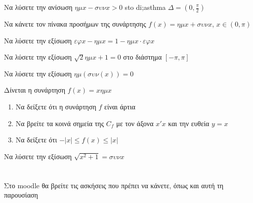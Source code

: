 \documentclass{../presentation}
\begin{document}
\begin{askisi}
  Να λύσετε την ανίσωση $ημx-συνx>0$ sto di;asthma $Δ=(0,\frac{π}{2})$

\end{askisi}

\begin{askisi}
  Να κάνετε τον πίνακα προσήμων της συνάρτησης $f(x)=ημx+συνx$, $x\in (0,π)$

\end{askisi}

\begin{askisi}
  Να λύσετε την εξίσωση $εφx-ημx=1-ημx\cdot εφx$

\end{askisi}

\begin{askisi}
  Να λύσετε την εξίσωση $\sqrt{2}ημx+1=0$ στο διάστημα $[-π,π]$

\end{askisi}

\begin{askisi}
  Να λύσετε την εξίσωση $ημ(συν(x))=0$

\end{askisi}

\begin{askisi}
  Δίνεται η συνάρτηση $f(x)=xημx$
  \begin{enumerate}
    \item<1-> Να δείξετε ότι η συνάρτηση $f$ είναι άρτια
    \item<2-> Να βρείτε τα κοινά σημεία της $C_f$ με τον άξονα $x'x$ και την ευθεία $y=x$
    \item<3-> Να δείξετε ότι $-|x|\le f(x) \le |x|$
  \end{enumerate}
\end{askisi}

\begin{askisi}
  Να λύσετε την εξίσωση $\sqrt{x^2+1}=συνx$

\end{askisi}

\section{}
\begin{frame}
  Στο moodle θα βρείτε τις ασκήσεις που πρέπει να κάνετε, όπως και αυτή τη παρουσίαση
\end{frame}

\end{document}

